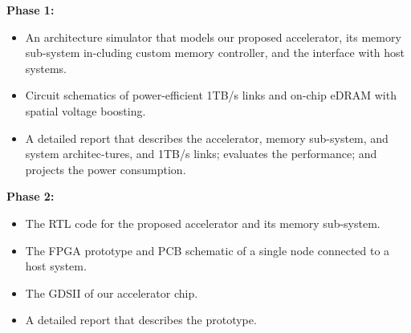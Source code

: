 

\noindent
\textbf{Phase 1:}
\begin{itemize}
\item An architecture simulator that models our proposed accelerator, its memory sub-system in-cluding custom memory controller, and the interface with host systems.
\item Circuit schematics of power-efficient 1TB/s links and on-chip eDRAM with spatial voltage boosting.
\item A detailed report that describes the accelerator, memory sub-system, and system architec-tures, and 1TB/s links; evaluates the performance; and projects the power consumption.
\end{itemize}

\noindent
\textbf{Phase 2:}
\begin{itemize}
\item The RTL code for the proposed accelerator and its memory sub-system.
\item The FPGA prototype and PCB schematic of a single node connected to a host system.
\item The GDSII of our accelerator chip.
\item A detailed report that describes the prototype.
\end{itemize}

